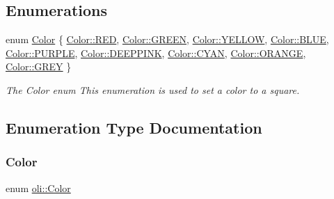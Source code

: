 \subsection*{Enumerations}
\begin{DoxyCompactItemize}
\item 
enum \hyperlink{namespaceoli_aac44697e43b3ab2ad32fe892ab2276eb}{Color} \{ \newline
\hyperlink{namespaceoli_aac44697e43b3ab2ad32fe892ab2276ebaa2d9547b5d3dd9f05984475f7c926da0}{Color\+::\+R\+ED}, 
\hyperlink{namespaceoli_aac44697e43b3ab2ad32fe892ab2276eba9de0e5dd94e861317e74964bed179fa0}{Color\+::\+G\+R\+E\+EN}, 
\hyperlink{namespaceoli_aac44697e43b3ab2ad32fe892ab2276eba8a568e5f41b7e4da88fe5c4a00aad34e}{Color\+::\+Y\+E\+L\+L\+OW}, 
\hyperlink{namespaceoli_aac44697e43b3ab2ad32fe892ab2276eba1b3e1ee9bff86431dea6b181365ba65f}{Color\+::\+B\+L\+UE}, 
\newline
\hyperlink{namespaceoli_aac44697e43b3ab2ad32fe892ab2276ebaec9c138095a352a9b7ef9ca5363b14d9}{Color\+::\+P\+U\+R\+P\+LE}, 
\hyperlink{namespaceoli_aac44697e43b3ab2ad32fe892ab2276eba90c86d1e3da733aaf155dcc24f2a235b}{Color\+::\+D\+E\+E\+P\+P\+I\+NK}, 
\hyperlink{namespaceoli_aac44697e43b3ab2ad32fe892ab2276eba344dd8cd533280795b9db82ef0c92749}{Color\+::\+C\+Y\+AN}, 
\hyperlink{namespaceoli_aac44697e43b3ab2ad32fe892ab2276eba5b6490317b6f7270bc3ab5ffd07c1f52}{Color\+::\+O\+R\+A\+N\+GE}, 
\newline
\hyperlink{namespaceoli_aac44697e43b3ab2ad32fe892ab2276eba3c551f0d1a06b4f852d1832daed357bf}{Color\+::\+G\+R\+EY}
 \}\begin{DoxyCompactList}\small\item\em The Color enum This enumeration is used to set a color to a square. \end{DoxyCompactList}
\end{DoxyCompactItemize}


\subsection{Enumeration Type Documentation}
\hypertarget{namespaceoli_aac44697e43b3ab2ad32fe892ab2276eb}{}\label{namespaceoli_aac44697e43b3ab2ad32fe892ab2276eb} 
\subsubsection{\texorpdfstring{Color}{Color}}
{\footnotesize\ttfamily enum \hyperlink{namespaceoli_aac44697e43b3ab2ad32fe892ab2276eb}{oli\+::\+Color}\hspace{0.3cm}{\ttfamily [strong]}}




